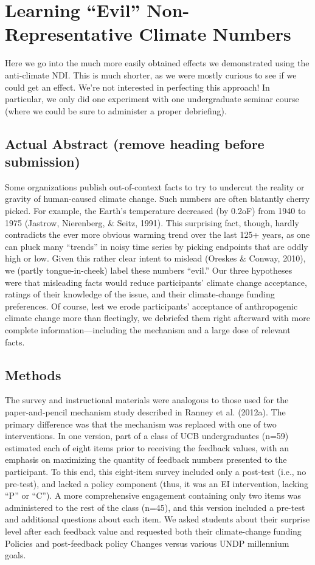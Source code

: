 \graphicspath{{evil-ndi/}}

\chapter{Learning \texorpdfstring{``Evil''}{"Evil"} Non-Representative Climate Numbers}
\label{chap:evilndi}

Here we go into the much more easily obtained effects we demonstrated using the
anti-climate NDI. This is much shorter, as we were mostly curious to see if we
could get an effect. We're not interested in perfecting this approach! In
particular, we only did one experiment with one undergraduate seminar course
(where we could be sure to administer a proper debriefing).

\section{Actual Abstract (remove heading before submission)}

Some organizations publish out-of-context facts to try to undercut the reality
or gravity of human-caused climate change. Such numbers are often blatantly
cherry picked. For example, the Earth’s temperature decreased (by 0.2oF) from
1940 to 1975 (Jastrow, Nierenberg, \& Seitz, 1991). This surprising fact, though,
hardly contradicts the ever more obvious warming trend over the last 125+ years,
as one can pluck many ``trends'' in noisy time series by picking endpoints that
are oddly high or low. Given this rather clear intent to mislead (Oreskes \&
Conway, 2010), we (partly tongue-in-cheek) label these numbers ``evil.'' Our three
hypotheses were that misleading facts would reduce participants’ climate change
acceptance, ratings of their knowledge of the issue, and their climate-change
funding preferences. Of course, lest we erode participants’ acceptance of
anthropogenic climate change more than fleetingly, we debriefed them right
afterward with more complete information––including the mechanism and a large
dose of relevant facts.

\section{Methods} The survey and instructional materials were analogous to those used for
the paper-and-pencil mechanism study described in Ranney et al. (2012a). The
primary difference was that the mechanism was replaced with one of two
interventions. In one version, part of a class of UCB undergraduates (n=59)
estimated each of eight items prior to receiving the feedback values, with an
emphasis on maximizing the quantity of feedback numbers presented to the
participant. To this end, this eight-item survey included only a post-test
(i.e., no pre-test), and lacked a policy component (thus, it was an EI
intervention, lacking ``P'' or ``C''). A more comprehensive engagement containing
only two items was administered to the rest of the class (n=45), and this
version included a pre-test and additional questions about each item. We asked
students about their surprise level after each feedback value and requested both
their climate-change funding Policies and post-feedback policy Changes versus
various UNDP millennium goals.

